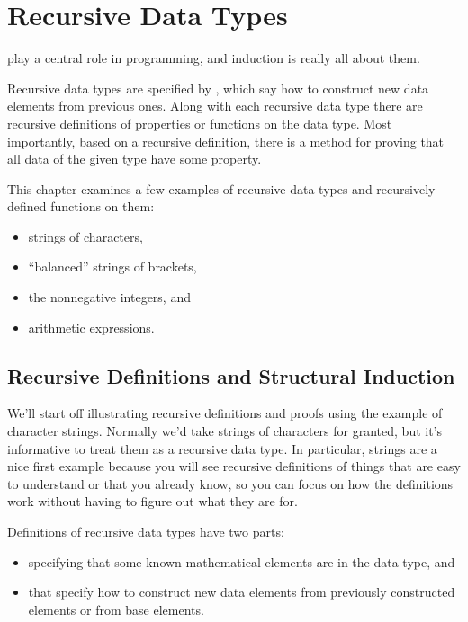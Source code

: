 \chapter{Recursive Data Types}\label{recursive_data_chap}

 play a central role in programming, and
induction is really all about them.

Recursive data types are specified by ,
which say how to construct new data elements from previous ones.
Along with each recursive data type there are recursive definitions of
properties or functions on the data type.  Most importantly, based on
a recursive definition, there is a  method
for proving that all data of the given type have some property.

This chapter examines a few examples of recursive data types and
recursively defined functions on them:
\begin{itemize}
\item strings of characters,
\item ``balanced'' strings of brackets,
\item the nonnegative integers, and
\item arithmetic expressions.
\end{itemize}

\section{Recursive Definitions and Structural Induction}

We'll start off illustrating recursive definitions and proofs using
the example of character strings.  Normally we'd take strings of
characters for granted, but it's informative to treat them as a
recursive data type.  In particular, strings are a nice first example
because you will see recursive definitions of things that are easy to
understand or that you already know, so you can focus on how the
definitions work without having to figure out what they are for.

Definitions of recursive data types have two parts:
\begin{itemize}
\item {} specifying that some known
  mathematical elements are in the data type, and

\item {} that specify how to construct new data
  elements from previously constructed elements or from base elements.
\end{itemize}

